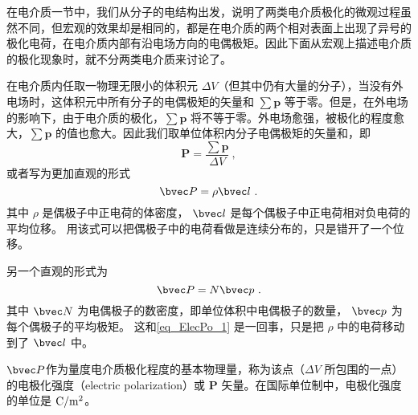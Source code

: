 
\begin{issues}
\end{issues}


在电介质一节中，我们从分子的电结构出发，说明了两类电介质极化的微观过程虽然不同，但宏观的效果却是相同的，都是在电介质的两个相对表面上出现了异号的极化电荷，在电介质内部有沿电场方向的电偶极矩。因此下面从宏观上描述电介质的极化现象时，就不分两类电介质来讨论了。

在电介质内任取一物理无限小的体积元 $\Delta V$（但其中仍有大量的分子），当没有外电场时，这体积元中所有分子的电偶极矩的矢量和 $\sum \mathbf p$ 等于零。但是，在外电场的影响下，由于电介质的极化，$\sum \mathbf p$ 将不等于零。外电场愈强，被极化的程度愈大，$\sum \mathbf p$ 的值也愈大。因此我们取单位体积内分子电偶极矩的矢量和，即
\begin{equation}
\mathbf P=\frac{\sum \mathbf p}{\Delta V} ~,
\end{equation}
或者写为更加直观的形式
\begin{equation}\label{eq_ElecPo_1}
\bvec P = \rho \bvec l~.
\end{equation}
其中 $\rho$ 是偶极子中正电荷的体密度， $\bvec l$ 是每个偶极子中正电荷相对负电荷的平均位移。 用该式可以把偶极子中的电荷看做是连续分布的，只是错开了一个位移。

另一个直观的形式为
\begin{equation}
\bvec P = N \bvec p~.
\end{equation}
其中 $\bvec N$ 为电偶极子的数密度，即单位体积中电偶极子的数量， $\bvec p$ 为每个偶极子的平均极矩。 这和\autoref{eq_ElecPo_1} 是一回事，只是把 $\rho$ 中的电荷移动到了 $\bvec l$ 中。

$\bvec P$作为量度电介质极化程度的基本物理量，称为该点（$\Delta V$ 所包围的一点）的电极化强度（electric polarization）或 $\mathbf P$ 矢量。在国际单位制中，电极化强度的单位是 $\rm C/m^2$。
